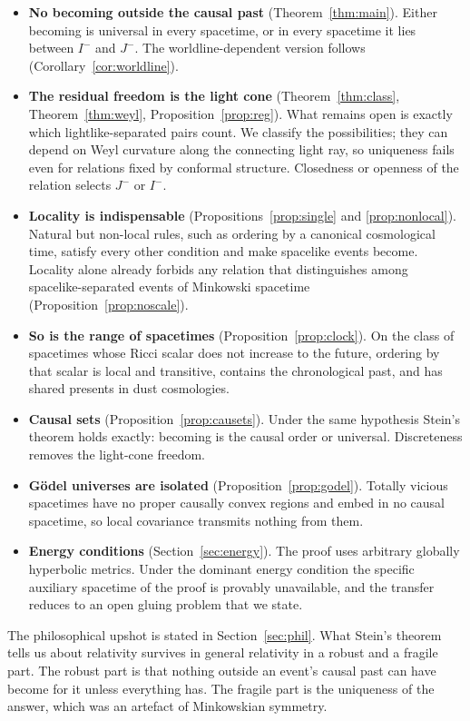 \documentclass[11pt]{article}
\theoremstyle{definition}
\newcommand{\Ichr}{I^{-}}
\newcommand{\Jm}{J^{-}}
\begin{document}
\begin{itemize}
\item \textbf{No becoming outside the causal past} (Theorem~\ref{thm:main}).
Either becoming is universal in every spacetime, or in every spacetime it lies
between $\Ichr$ and $\Jm$. The worldline-dependent version follows
(Corollary~\ref{cor:worldline}).
\item \textbf{The residual freedom is the light cone} (Theorem~\ref{thm:class},
Theorem~\ref{thm:weyl}, Proposition~\ref{prop:reg}). What remains open is
exactly which lightlike-separated pairs count. We classify the possibilities;
they can depend on Weyl curvature along the connecting light ray, so
uniqueness fails even for relations fixed by conformal structure. Closedness or
openness of the relation selects $\Jm$ or $\Ichr$.
\item \textbf{Locality is indispensable} (Propositions~\ref{prop:single} and
\ref{prop:nonlocal}). Natural but non-local rules, such as ordering by a
canonical cosmological time, satisfy every other condition and make spacelike
events become. Locality alone already forbids any relation that distinguishes
among spacelike-separated events of Minkowski spacetime
(Proposition~\ref{prop:noscale}).
\item \textbf{So is the range of spacetimes} (Proposition~\ref{prop:clock}).
On the class of spacetimes whose Ricci scalar does not increase to the future,
ordering by that scalar is local and transitive, contains the chronological
past, and has shared presents in dust cosmologies.
\item \textbf{Causal sets} (Proposition~\ref{prop:causets}). Under the same
hypothesis Stein's theorem holds exactly: becoming is the causal order or
universal. Discreteness removes the light-cone freedom.
\item \textbf{Gödel universes are isolated} (Proposition~\ref{prop:godel}).
Totally vicious spacetimes have no proper causally convex regions and embed
in no causal spacetime, so local covariance transmits nothing from them.
\item \textbf{Energy conditions} (Section~\ref{sec:energy}). The proof uses
arbitrary globally hyperbolic metrics. Under the dominant energy condition the
specific auxiliary spacetime of the proof is provably unavailable, and the transfer reduces to an open
gluing problem that we state.
\end{itemize}

The philosophical upshot is stated in Section~\ref{sec:phil}. What Stein's
theorem tells us about relativity survives in general relativity in a robust
and a fragile part. The robust part is that nothing outside an event's causal
past can have become for it unless everything has. The fragile part is the
uniqueness of the answer, which was an artefact of Minkowskian symmetry.
\end{document}
